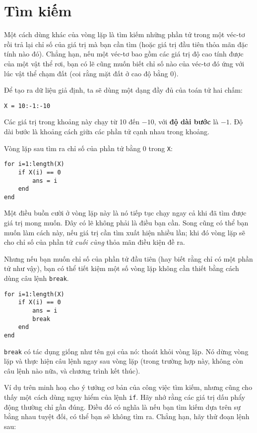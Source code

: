 \documentclass[12pt]{book}
\begin{document}
\section{Tìm kiếm}
\label{search}

Một cách dùng khác của vòng lặp là tìm kiếm những phần tử trong
một véc-tơ rồi trả lại chỉ số của giá trị mà bạn cần tìm (hoặc
giá trị đầu tiên thỏa mãn đặc tính nào đó). Chẳng hạn, nếu một
véc-tơ bao gồm các giá trị độ cao tính được của một vật thể
rơi, bạn có lẽ cũng muốn biết chỉ số nào của véc-tơ đó ứng với
lúc vật thể chạm đất (coi rằng mặt đất ở cao độ bằng 0).

Để tạo ra dữ liệu giả định, ta sẽ dùng một dạng đầy đủ của 
toán tử hai chấm:

\begin{verbatim}
X = 10:-1:-10
\end{verbatim}
%
Các giá trị trong khoảng này chạy từ 10 đến $-10$, với 
{\bf độ dài bước} là $-1$. Độ dài bước là khoảng cách giữa các
phần tử cạnh nhau trong khoảng.

Vòng lặp sau tìm ra chỉ số của phần tử bằng 0 trong {\tt X}:

\begin{verbatim}
for i=1:length(X)
    if X(i) == 0
        ans = i
    end
end
\end{verbatim}
%
Một điều buồn cười ở vòng lặp này là nó tiếp tục chạy ngay cả khi
đã tìm được giá trị mong muốn. Đây có lẽ không phải là điều bạn
cần. Song cũng có thể bạn muốn làm cách này, nếu giá trị cần tìm
xuất hiện nhiều lần; khi đó vòng lặp sẽ cho chỉ số của phần tử
{\em cuối cùng} thỏa mãn điều kiện đề ra.

Nhưng nếu bạn muốn chỉ số của phần tử đầu tiên (hay biết rằng chỉ
có một phần tử như vậy), bạn có thể tiết kiệm một số vòng lặp 
không cần thiết bằng cách dùng câu lệnh {\tt break}.

\begin{verbatim}
for i=1:length(X)
    if X(i) == 0
        ans = i
        break
    end
end
\end{verbatim}
%
{\tt break} có tác dụng giống như tên gọi của nó: thoát khỏi
vòng lặp. Nó dừng vòng lặp và thực hiện câu lệnh ngay sau 
vòng lặp (trong trường hợp này, không còn câu lệnh nào nữa,
và chương trình kết thúc).

Ví dụ trên minh hoạ cho ý tưởng cơ bản của công việc tìm kiếm,
nhưng cũng cho thấy một cách dùng nguy hiểm của lệnh {\tt if}.
Hãy nhớ rằng các giá trị dấu phẩy động thường chỉ gần đúng. 
Điều đó có nghĩa là nếu bạn tìm kiếm dựa trên sự bằng nhau tuyệt
đối, có thể bạn sẽ không tìm ra. Chẳng hạn, hãy thử đoạn lệnh sau:
\end{document}
